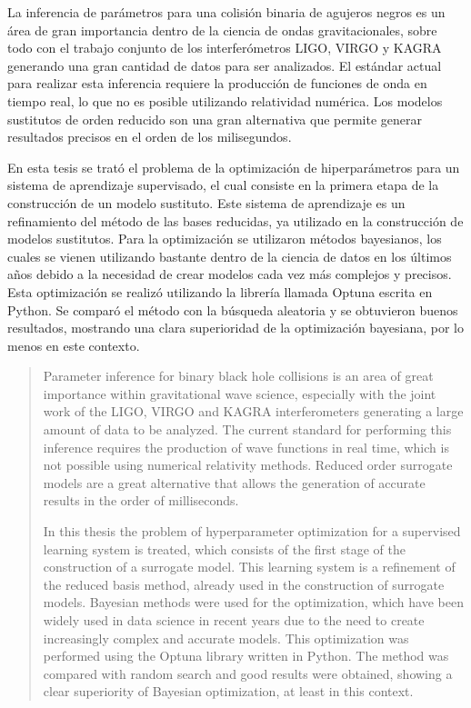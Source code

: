 \begin{resumen}%


La inferencia de parámetros para una colisión binaria de agujeros negros es un área de gran importancia dentro de la ciencia de ondas gravitacionales, sobre todo con el trabajo conjunto de los interferómetros LIGO, VIRGO y KAGRA generando una gran cantidad de datos para ser analizados. El estándar actual para realizar esta inferencia requiere la producción de funciones de onda en tiempo real, lo que no es posible utilizando relatividad numérica. Los modelos sustitutos de orden reducido son una gran alternativa que permite generar resultados precisos en el orden de los milisegundos.

En esta tesis se trató el problema de la optimización de hiperparámetros para un sistema de aprendizaje supervisado, el cual consiste en la primera etapa de la construcción de un modelo sustituto. Este sistema de aprendizaje es un refinamiento del método de las bases reducidas, ya utilizado en la construcción de modelos sustitutos. 
Para la optimización se utilizaron métodos bayesianos, los cuales se vienen utilizando bastante dentro de la ciencia de datos en los últimos años debido a la necesidad de crear modelos cada vez más complejos y precisos. Esta optimización se realizó utilizando la librería llamada Optuna escrita en Python. Se comparó el método con la búsqueda aleatoria y se obtuvieron buenos resultados, mostrando una clara superioridad de la optimización bayesiana, por lo menos en este contexto.


\end{resumen}

\begin{abstract}%
Parameter inference for binary black hole collisions is an area of great importance within gravitational wave science, especially with the joint work of the LIGO, VIRGO and KAGRA interferometers generating a large amount of data to be analyzed. The current standard for performing this inference requires the production of wave functions in real time, which is not possible using numerical relativity methods. Reduced order surrogate models are a great alternative that allows the generation of accurate results in the order of milliseconds.

In this thesis the problem of hyperparameter optimization for a supervised learning system is treated, which consists of the first stage of the construction of a surrogate model. This learning system is a refinement of the reduced basis method, already used in the construction of surrogate models. 
Bayesian methods were used for the optimization, which have been widely used in data science in recent years due to the need to create increasingly complex and accurate models. This optimization was performed using the Optuna library written in Python. The method was compared with random search and good results were obtained, showing a clear superiority of Bayesian optimization, at least in this context.

\end{abstract}



